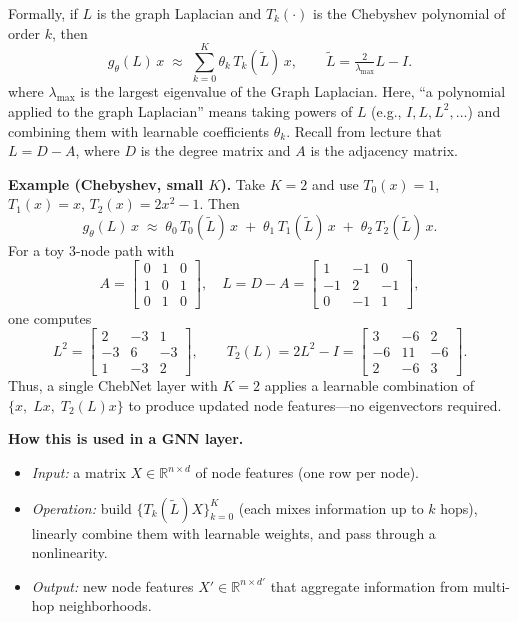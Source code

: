 \documentclass[twoside,10pt]{article}
\begin{document}
Formally, if $L$ is the graph Laplacian and $T_k(\cdot)$ is the Chebyshev polynomial of order $k$, then
\[
g_\theta(L)\,x \;\approx\; \sum_{k=0}^K \theta_k\, T_k(\tilde{L})\, x,
\qquad \tilde{L}=\tfrac{2}{\lambda_{\max}}L - I .
\]
where $\lambda_{\max}$ is the largest eigenvalue of the Graph Laplacian. 
Here, ``a polynomial applied to the graph Laplacian'' means taking powers of $L$ (e.g., $I, L, L^2,\dots$) and combining them with learnable coefficients $\theta_k$.  
Recall from lecture that $L = D - A$, where $D$ is the degree matrix and $A$ is the adjacency matrix.  

\medskip
\textbf{Example (Chebyshev, small $K$).}  
Take $K=2$ and use $T_0(x)=1$, $T_1(x)=x$, $T_2(x)=2x^2-1$. Then
\[
g_\theta(L)\,x \;\approx\; \theta_0\,T_0(\tilde L)\,x \;+\; \theta_1\,T_1(\tilde L)\,x \;+\; \theta_2\,T_2(\tilde L)\,x.
\]
For a toy 3-node path with
\[
A=\begin{bmatrix}
0&1&0\\
1&0&1\\
0&1&0
\end{bmatrix},\quad
L=D-A=\begin{bmatrix}
1&-1&0\\
-1&2&-1\\
0&-1&1
\end{bmatrix},
\]
one computes
\[
L^2=\begin{bmatrix}
2&-3&1\\
-3&6&-3\\
1&-3&2
\end{bmatrix},\qquad
T_2(L)=2L^2-I=\begin{bmatrix}
3&-6&2\\
-6&11&-6\\
2&-6&3
\end{bmatrix}.
\]
Thus, a single ChebNet layer with $K=2$ applies a learnable combination of $\{x,\;Lx,\;T_2(L)x\}$ to produce updated node features---no eigenvectors required.

\medskip
\textbf{How this is used in a GNN layer.}
\begin{itemize}
    \item \emph{Input:} a matrix $X\in\mathbb{R}^{n\times d}$ of node features (one row per node).  
    \item \emph{Operation:} build $\{T_k(\tilde L)X\}_{k=0}^K$ (each mixes information up to $k$ hops), linearly combine them with learnable weights, and pass through a nonlinearity.  
    \item \emph{Output:} new node features $X'\in\mathbb{R}^{n\times d'}$ that aggregate information from multi-hop neighborhoods.  
\end{itemize}
\end{document}
